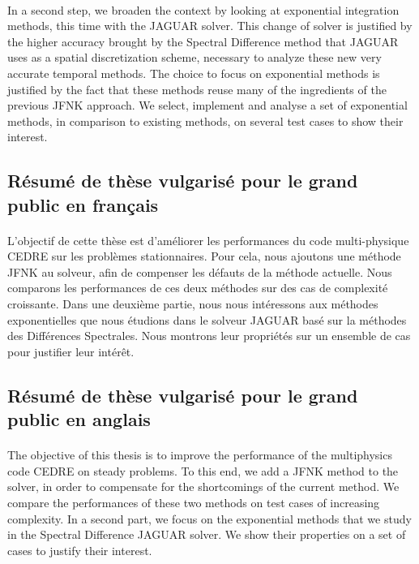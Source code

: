     \paragraph{}
    In a second step, we broaden the context by looking at exponential integration methods, this time with the JAGUAR solver.
    This change of solver is justified by the higher accuracy brought by the Spectral Difference method that JAGUAR uses as a spatial discretization scheme, necessary to analyze these new very accurate temporal methods.
    The choice to focus on exponential methods is justified by the fact that these methods reuse many of the ingredients of the previous JFNK approach.
    We select, implement and analyse a set of exponential methods, in comparison to existing methods, on several test cases to show their interest.


  \subsection*{Résumé de thèse vulgarisé pour le grand public en français}

    \paragraph{}
    L'objectif de cette thèse est d'améliorer les performances du code multi-physique CEDRE sur les problèmes stationnaires.
    Pour cela, nous ajoutons une méthode JFNK au solveur, afin de compenser les défauts de la méthode actuelle.
    Nous comparons les performances de ces deux méthodes sur des cas de complexité croissante.
    Dans une deuxième partie, nous nous intéressons aux méthodes exponentielles que nous étudions dans le solveur JAGUAR basé sur la méthodes des Différences Spectrales.
    Nous montrons leur propriétés sur un ensemble de cas pour justifier leur intérêt.


  \subsection*{Résumé de thèse vulgarisé pour le grand public en anglais}

    \paragraph{}
    The objective of this thesis is to improve the performance of the multiphysics code CEDRE on steady problems.
    To this end, we add a JFNK method to the solver, in order to compensate for the shortcomings of the current method.
    We compare the performances of these two methods on test cases of increasing complexity.
    In a second part, we focus on the exponential methods that we study in the Spectral Difference JAGUAR solver.
    We show their properties on a set of cases to justify their interest.
